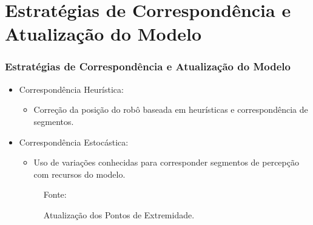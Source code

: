 \documentclass[xcolor=dvipsnames, aspectratio=169]{beamer}
\begin{document}
\section{Estratégias de Correspondência e Atualização do Modelo}
  \begin{frame}
  \frametitle{Estratégias de Correspondência e Atualização do Modelo}
  \begin{itemize}
      \item Correspondência Heurística: 
      \begin{itemize}
        \item Correção da posição do robô baseada em heurísticas e correspondência de segmentos.
      \end{itemize}
      \item Correspondência Estocástica:
      \begin{itemize}
        \item  Uso de variações conhecidas para corresponder segmentos de percepção com recursos do modelo.
      \end{itemize}

      \begin{figure}
        \centering
        {Fonte: \cite{moutarlier2006experimental}}
        \caption{Atualização dos Pontos de Extremidade.}
        \label{fig:5}
      \end{figure}
      

\end{itemize}
\end{frame}
\end{document}
